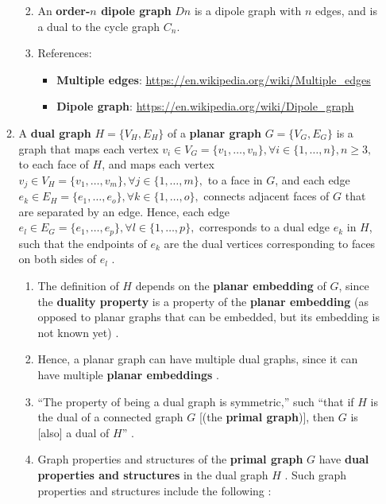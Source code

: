 \begin{enumerate}
\begin{enumerate}
\begin{enumerate}
\begin{itemize}
			\end{itemize}
		\item An {\bf order-$n$ dipole graph} $Dn$ is a dipole graph with $n$ edges, and is a dual to the cycle graph $C_{n}$.
		\item References: \vspace{-0.1cm}
			\begin{itemize} \itemsep -1pt
			\item {\bf Multiple edges}: \url{https://en.wikipedia.org/wiki/Multiple_edges}
			\item {\bf Dipole graph}: \url{https://en.wikipedia.org/wiki/Dipole_graph}
			\end{itemize}
		\end{enumerate}
	\item A {\bf dual graph} $H = \{V_{H}, E_{H}\}$ of a {\bf planar graph} $G = \{V_{G}, E_{G}\}$ \cite{WikipediaContributors2018a43} is a graph that maps each vertex $v_{i} \in V_{G} = \{v_{1}, \dots, v_{n}\}, \forall i \in \{1, \dots, n\}, n \geq 3,$ to each face of $H$, and maps each vertex $v_{j} \in V_{H} = \{v_{1}, \dots, v_{m}\}, \forall j \in \{1, \dots, m\},$ to a face in $G$, and each edge $e_{k} \in E_{H} = \{e_{1}, \dots, e_{o}\}, \forall k \in \{1, \dots, o\},$ connects adjacent faces of $G$ that are separated by an edge. Hence, each edge $e_{l} \in E_{G} = \{e_{1}, \dots, e_{p}\}, \forall l \in \{1, \dots, p\},$ corresponds to a dual edge $e_{k}$ in $H$, such that the endpoints of $e_{k}$ are the dual vertices corresponding to faces on both sides of $e_{l}$ \cite{WikipediaContributors2018a48}.\vspace{-0.2cm}
		\begin{enumerate} \itemsep -2pt
		\item The definition of $H$ depends on the {\bf planar embedding} of $G$, since the {\bf duality property} is a property of the {\bf planar embedding} (as opposed to planar graphs that can be embedded, but its embedding is not known yet) \cite{WikipediaContributors2018a48}.
		\item Hence, a planar graph can have multiple dual graphs, since it can have multiple {\bf planar embeddings} \cite{WikipediaContributors2018a48}.
		\item ``The property of being a dual graph is symmetric,'' such ``that if $H$ is the dual of a connected graph $G$ [(the {\bf primal graph})], then $G$ is [also] a dual of $H$'' \cite{WikipediaContributors2018a48}.
		\item Graph properties and structures of the {\bf primal graph} $G$ have {\bf dual properties and structures} in the dual graph $H$ \cite{WikipediaContributors2018a48}. Such graph properties and structures include the following \cite{WikipediaContributors2018a48}:

\end{enumerate}
\end{enumerate}
\end{enumerate}
